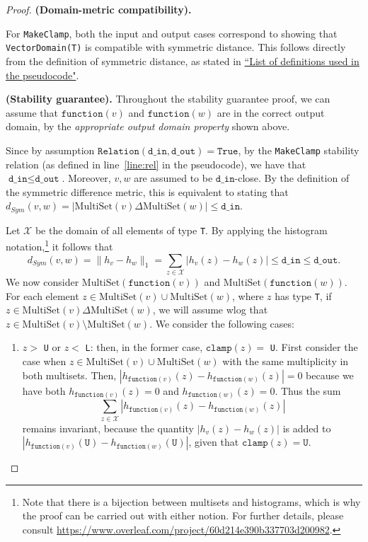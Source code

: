 \documentclass[11pt,a4paper]{article}
\theoremstyle{definition}
\newcommand{\MultiSet}{\mathrm{MultiSet}}
\newcommand{\din}{\texttt{d\_in}}
\newcommand{\dout}{\texttt{d\_out}}
\newcommand{\Relation}{\texttt{Relation}}
\newcommand{\True}{\texttt{True}}
\newcommand{\clamp}{\texttt{clamp}}
\newcommand{\function}{\texttt{function}}
\begin{document}
\begin{proof}
\smallskip
\textbf{(Domain-metric compatibility).} 

For \texttt{MakeClamp}, both the input and output cases correspond to showing that \texttt{VectorDomain(T)} is compatible with symmetric distance. This follows directly from the definition of symmetric distance, as stated in \href{https://www.overleaf.com/project/60d215bf90b337ac02200a99}{``List of definitions used in the pseudocode"}.

\smallskip
\textbf{(Stability guarantee).} Throughout the stability guarantee proof, we can assume that $\function(v)$ and $\function(w)$ are in the correct output domain, by the \textit{appropriate output domain property} shown above. 

Since by assumption $\Relation(\din, \dout) = \True$, by the \texttt{MakeClamp} stability relation (as defined in line~\ref{line:rel} in the pseudocode), we have that $\din \leq \dout$. Moreover, $v, w$ are assumed to be $\din$-close. By the definition of the symmetric difference metric, this is equivalent to stating that $d_{Sym}(v, w) = |\MultiSet(v) \Delta \MultiSet(w)| \leq \din$.

Let $\mathcal{X}$ be the domain of all elements of type \texttt{T}. By applying the histogram notation,\footnote{Note that there is a bijection between multisets and histograms, which is why the proof can be carried out with either notion. For further details, please consult \url{https://www.overleaf.com/project/60d214e390b337703d200982}.}  it follows that
\[
d_{Sym}(v, w) = \lVert h_{v} - h_{w}\rVert_1 = \sum_{z \in \mathcal{X}} |h_v(z) - h_w(z)| \leq \din \leq \dout.
\]
We now consider $\MultiSet(\function(v))$ and $\MultiSet(\function(w))$.
For each element $z \in \MultiSet(v) \cup \MultiSet(w)$, where $z$ has type \texttt{T}, if $z \in \MultiSet(v) \Delta \MultiSet(w)$, we will assume wlog that $z \in \MultiSet(v) \setminus \MultiSet(w)$. We consider the following cases:

\begin{enumerate}
    \item $z >$ \texttt{U} or $z <$ \texttt{L}: then, in the former case, $\clamp(z) =$ \texttt{U}. First consider the case when $z \in \MultiSet(v) \cup \MultiSet(w)$ with the same multiplicity in both multisets. Then, $|h_{\function(v)}(z) - h_{\function(w)}(z)| = 0$ because we have both $h_{\function(v)}(z) = 0$ and $h_{\function(w)}(z) = 0$. Thus the sum
    \[
    \sum_{z \in \mathcal{X}} |h_{\function(v)}(z) - h_{\function(w)}(z)|
    \]
    remains invariant, because the quantity $|h_{v}(z) - h_{w}(z)|$ is added to $|h_{\function(v)}(\texttt{U}) - h_{\function(w)}(\texttt{U})|$, given that $\clamp(z) = \texttt{U}$. 
    

\end{enumerate}
\end{proof}
\end{document}
